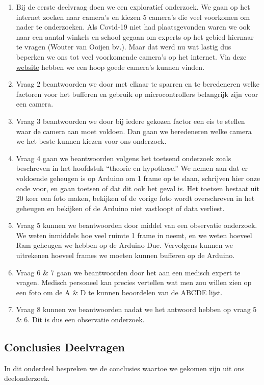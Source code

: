 \documentclass{article}
\begin{document}
\begin{enumerate}
	\item Bij de eerste deelvraag doen we een exploratief onderzoek. We gaan op het internet zoeken naar camera’s en kiezen 5 camera’s die veel voorkomen om nader te onderzoeken. Als Covid-19 niet had plaatsgevonden waren we ook naar een aantal winkels en school gegaan om experts op het gebied hiernaar te vragen (Wouter van Ooijen bv.). Maar dat werd nu wat lastig dus beperken we ons tot veel voorkomende camera’s op het internet. Via deze \href{https://www.open-electronics.org/a-complete-guide-to-arduino-based-video-camera/}{website} hebben we een hoop goede camera’s kunnen vinden.
	\item Vraag 2 beantwoorden we door met elkaar te sparren en te beredeneren welke factoren voor het bufferen en gebruik op microcontrollers belangrijk zijn voor een camera.
	\item Vraag 3 beantwoorden we door bij iedere gekozen factor een eis te stellen waar de camera aan moet voldoen. Dan gaan we beredeneren welke camera we het beste kunnen kiezen voor ons onderzoek.
	\item Vraag 4 gaan we beantwoorden volgens het toetsend onderzoek zoals beschreven in het hoofdstuk “theorie en hypothese.” We nemen aan dat er voldoende geheugen is op Arduino om 1 frame op te slaan, schrijven hier onze code voor, en gaan toetsen of dat dit ook het geval is. Het toetsen bestaat uit 20 keer een foto maken, bekijken of de vorige foto wordt overschreven in het geheugen en bekijken of de Arduino niet vastloopt of data verliest.
	\item Vraag 5 kunnen we beantwoorden door middel van een observatie onderzoek. We weten inmiddels hoe veel ruimte 1 frame in neemt, en we weten hoeveel Ram geheugen we hebben op de Arduino Due. Vervolgens kunnen we uitrekenen hoeveel frames we moeten kunnen bufferen op de Arduino.
	\item Vraag 6 {\&} 7 gaan we beantwoorden door het aan een medisch expert te vragen. Medisch personeel kan precies vertellen wat men zou willen zien op een foto om de A {\&} D te kunnen beoordelen van de ABCDE lijst.
	\item Vraag 8 kunnen we beantwoorden nadat we het antwoord hebben op vraag 5 {\&} 6. Dit is dus een observatie onderzoek.  

\end{enumerate} 

\subsection{Conclusies Deelvragen}
In dit onderdeel bespreken we de conclusies waartoe we gekomen zijn uit ons deelonderzoek.
\end{document}
